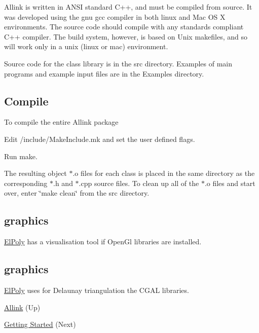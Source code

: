 \-Allink is written in \-A\-N\-S\-I standard \-C++, and must be compiled from source. \-It was developed using the gnu gcc compiler in both linux and \-Mac \-O\-S \-X environments. \-The source code should compile with any standards compliant \-C++ compiler. \-The build system, however, is based on \-Unix makefiles, and so will work only in a unix (linux or mac) environment.

\-Source code for the class library is in the src directory. \-Examples of main programs and example input files are in the \-Examples directory.\hypertarget{compile_page_compile_library_section}{}\subsection{\-Compile}\label{compile_page_compile_library_section}
\-To compile the entire \-Allink package 
\begin{DoxyItemize}
\item \-Edit /include/\-Make\-Include.mk and set the user defined flags. 
\item \-Run make.   
\end{DoxyItemize}

\-The resulting object $\ast$.o files for each class is placed in the same directory as the corresponding $\ast$.h and $\ast$.cpp source files. \-To clean up all of the $\ast$.o files and start over, enter \char`\"{}make clean\char`\"{} from the src directory.\hypertarget{compile_page_enable}{}\subsection{graphics}\label{compile_page_enable}
\hyperlink{classElPoly}{\-El\-Poly} has a visualisation tool if \-Open\-Gl libraries are installed. \hypertarget{compile_page_enable}{}\subsection{graphics}\label{compile_page_enable}
\hyperlink{classElPoly}{\-El\-Poly} uses for \-Delaunay triangulation the \-C\-G\-A\-L libraries.


\begin{DoxyItemize}
\item \hyperlink{index}{\-Allink} (\-Up)  
\item \hyperlink{usage_page}{\-Getting \-Started} (\-Next)  
\end{DoxyItemize}